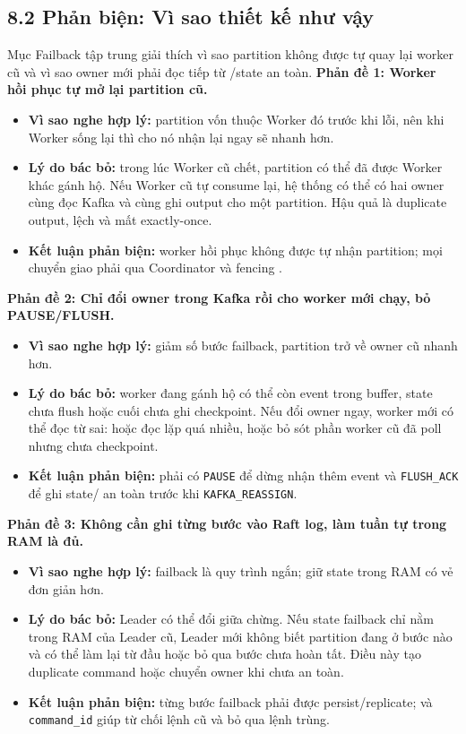 \documentclass[12pt,a4paper]{article}
\begin{document}
\subsection{8.2 Phản biện: Vì sao thiết kế như vậy}
Mục Failback tập trung giải thích vì sao partition không được tự quay lại worker cũ và vì sao owner mới phải đọc tiếp từ /state an toàn.
\textbf{Phản đề 1: Worker hồi phục tự mở lại partition cũ.}

\begin{itemize}
\item \textbf{Vì sao nghe hợp lý:} partition vốn thuộc Worker đó trước khi lỗi, nên khi Worker sống lại thì cho nó nhận lại ngay sẽ nhanh hơn.
\item \textbf{Lý do bác bỏ:} trong lúc Worker cũ chết, partition có thể đã được Worker khác gánh hộ. Nếu Worker cũ tự consume lại, hệ thống có thể có hai owner cùng đọc Kafka và cùng ghi output cho một partition. Hậu quả là duplicate output, lệch  và mất exactly-once.
\item \textbf{Kết luận phản biện:} worker hồi phục không được tự nhận partition; mọi chuyển giao phải qua Coordinator và fencing .
\end{itemize}
\textbf{Phản đề 2: Chỉ đổi owner trong Kafka rồi cho worker mới chạy, bỏ PAUSE/FLUSH.}

\begin{itemize}
\item \textbf{Vì sao nghe hợp lý:} giảm số bước failback, partition trở về owner cũ nhanh hơn.
\item \textbf{Lý do bác bỏ:} worker đang gánh hộ có thể còn event trong buffer, state chưa flush hoặc  cuối chưa ghi checkpoint. Nếu đổi owner ngay, worker mới có thể đọc từ  sai: hoặc đọc lặp quá nhiều, hoặc bỏ sót phần worker cũ đã poll nhưng chưa checkpoint.
\item \textbf{Kết luận phản biện:} phải có \texttt{PAUSE} để dừng nhận thêm event và \texttt{FLUSH\_ACK} để ghi state/ an toàn trước khi \texttt{KAFKA\_REASSIGN}.
\end{itemize}
\textbf{Phản đề 3: Không cần ghi từng bước vào Raft log, làm tuần tự trong RAM là đủ.}

\begin{itemize}
\item \textbf{Vì sao nghe hợp lý:} failback là quy trình ngắn; giữ state trong RAM có vẻ đơn giản hơn.
\item \textbf{Lý do bác bỏ:} Leader có thể đổi giữa chừng. Nếu state failback chỉ nằm trong RAM của Leader cũ, Leader mới không biết partition đang ở bước nào và có thể làm lại từ đầu hoặc bỏ qua bước chưa hoàn tất. Điều này tạo duplicate command hoặc chuyển owner khi  chưa an toàn.
\item \textbf{Kết luận phản biện:} từng bước failback phải được persist/replicate;  và \texttt{command\_id} giúp từ chối lệnh cũ và bỏ qua lệnh trùng.
\end{itemize}
\end{document}
